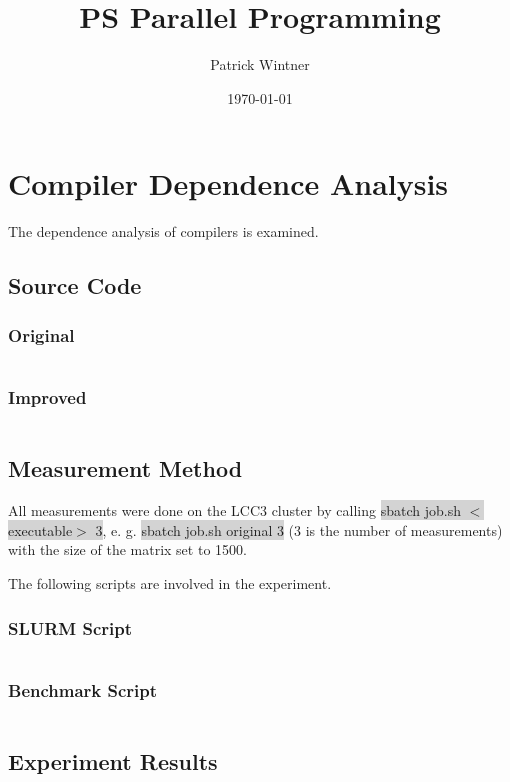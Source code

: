 \documentclass[parskip]{scrartcl}
\title{PS Parallel Programming}
\author{Patrick Wintner}
\date{\today}
\begin{document}
	\maketitle
	
	\section{Compiler Dependence Analysis}
	The dependence analysis of compilers is examined.
	\subsection{Source Code}
	\subsubsection{Original}
	\inputminted	[linenos]{c}{ex1/original.c}
	\subsubsection{Improved}
	\inputminted	[linenos]{c}{ex1/improved.c}
	\subsection{Measurement Method}
	All measurements were done on the LCC3 cluster by calling \colorbox{lightgray}{sbatch job.sh $<$executable$>$ 3}, e. g. \colorbox{lightgray}{sbatch job.sh original 3} (3 is the number of measurements) with the size of the matrix set to 1500.
	
	The following scripts are involved in the experiment.
	\subsubsection{SLURM Script}
	\inputminted[linenos]{bash}{ex1/job.sh}
	\subsubsection{Benchmark Script}
	\inputminted[linenos]{bash}{ex1/benchmark.sh}
	\subsection{Experiment Results}
\end{document}
